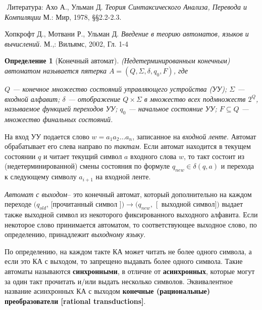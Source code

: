 \documentclass[10pt,twocolumn]{article}
\def\s{\Sigma }
\def\ra{\rightarrow}
\newtheorem{Definition}{Определение}
\begin{document}
{\footnotesize$ $
Литература: 
 Ахо А., Ульман Д. 
{\it Теория Синтаксического Анализа, Перевода и Компиляции}  М.: Мир, 1978, \S \S 2.2-2.3.


Хопкрофт Д., Мотвани Р., Ульман Д. 
{\em Введение в теорию автоматов, языков и вычислений.} М.,: Вильямс, 2002, Гл. 1-4


\medskip


\begin{Definition}[Конечный автомат]
(Не\-де\-тер\-ми\-ни\-ро\-ван\-ным ко\-неч\-ным) автоматом 
называется пятерка $A = (Q, \s, \delta, q_0, F)$, где

 $Q$ --- конечное множество {\em состояний} управляющего устрой\-ст\-ва (УУ);
 $\s$ --- входной алфавит;
  $\delta$ --- отображение $Q \times \s$ в множество всех подмножеств
$2^Q$, называемое функцией переходов УУ;
 $q_0$ --- начальное состояние УУ;
 $F \subseteq Q$ --- множество финальных состояний.
\end{Definition}

На вход УУ подается слово $w=a_1a_2\ldots a_n$, записанное на {\em
входной ленте}. Автомат обрабатывает его слева направо по {\em
тактам}. Если автомат находится в текущем состоянии $q$ и
читает текущий символ $a$ входного слова $w$, то такт состоит из
(недетерминированной)
смены состояния по формуле $q_{new}  \in \delta(q, a)$ и перехода к
следующему символу $a_{i+1}$ на входной ленте. 

{\em Автомат с выходом}-- это конечный
автомат, который дополнительно на каждом переходе $(q_{old}$,
$[$прочитанный символ $]) \ra (q_{new},$ [~выходной
символ$])$ выдает также выходной символ из некоторого фиксированного
выходного алфавита. Если некоторое слово принимается автоматом, то
соответствующее выходное слово, по определению, принадлежит {\em выходному
языку}. 

По определению, на каждом такте КА может читать не более одного символа, а если это КА с выходом, то запрещено
выдавать более одного символа. Такие автоматы называются
{\bf синхронными}, в отличие от {\bf асинхронных}, которые могут за один такт прочитать и$/$или выдать несколько
символов. Эквивалентное название асинхронных КА с выходом {\bf конечные (рациональные) преобразователи [rational
transductions]}. 

}
\end{document}
